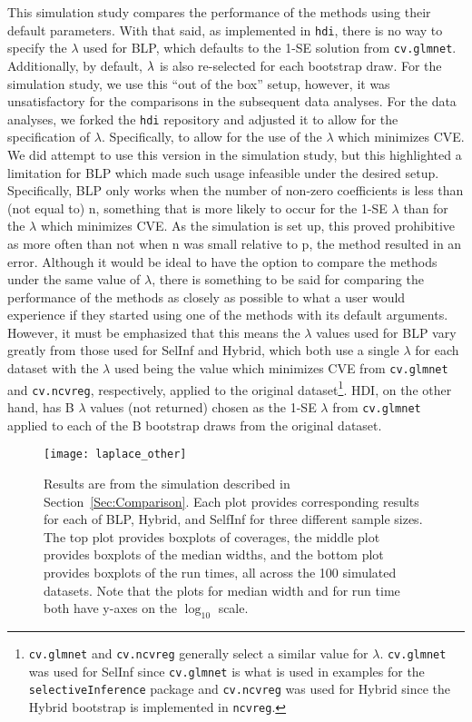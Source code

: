 This simulation study compares the performance of the methods using their default parameters. With that said, as implemented in \texttt{hdi}, there is no way to specify the $\lambda$ used for BLP, which defaults to the 1-SE solution from \texttt{cv.glmnet}. Additionally, by default, $\lambda$ is also re-selected for each bootstrap draw. For the simulation study, we use this ``out of the box'' setup, however, it was unsatisfactory for the comparisons in the subsequent data analyses. For the data analyses, we forked the \texttt{hdi} repository and adjusted it to allow for the specification of $\lambda$. Specifically, to allow for the use of the $\lambda$ which minimizes CVE. We did attempt to use this version in the simulation study, but this highlighted a limitation for BLP which made such usage infeasible under the desired setup. Specifically, BLP only works when the number of non-zero coefficients is less than (not equal to) n, something that is more likely to occur for the 1-SE $\lambda$ than for the $\lambda$ which minimizes CVE. As the simulation is set up, this proved prohibitive as more often than not when n was small relative to p, the method resulted in an error. Although it would be ideal to have the option to compare the methods under the same value of $\lambda$, there is something to be said for comparing the performance of the methods as closely as possible to what a user would experience if they started using one of the methods with its default arguments. However, it must be emphasized that this means the $\lambda$ values used for BLP vary greatly from those used for SelInf and Hybrid, which both use a single $\lambda$ for each dataset with the $\lambda$ used being the value which minimizes CVE from \texttt{cv.glmnet} and \texttt{cv.ncvreg}, respectively, applied to the original dataset\footnote{\texttt{cv.glmnet} and \texttt{cv.ncvreg} generally select a similar value for $\lambda$. \texttt{cv.glmnet} was used for SelInf since \texttt{cv.glmnet} is what is used in examples for the \texttt{selectiveInference} package and \texttt{cv.ncvreg} was used for Hybrid since the Hybrid bootstrap is implemented in \texttt{ncvreg}.}. HDI, on the other hand, has B $\lambda$ values (not returned) chosen as the 1-SE $\lambda$ from \texttt{cv.glmnet} applied to each of the B bootstrap draws from the original dataset.

\begin{figure}[hbtp]
  \begin{center}
  \texttt{[image: laplace\_other]}
  \caption{\label{Fig:laplace_other} Results are from the simulation described in Section~\ref{Sec:Comparison}. Each plot provides corresponding results for each of BLP, Hybrid, and SelfInf for three different sample sizes. The top plot provides boxplots of coverages, the middle plot provides boxplots of the median widths, and the bottom plot provides boxplots of the run times, all across the 100 simulated datasets. Note that the plots for median width and for run time both have y-axes on the $\log_{10}$ scale.}
  \end{center}
\end{figure}

